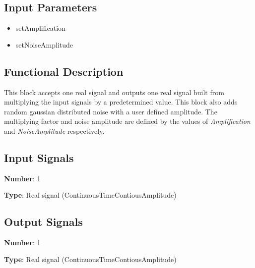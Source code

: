 \documentclass[../../sdf/tex/BPSK_system.tex]{subfiles}
\begin{document}
\onlyinsubfile{\maketitle}

\subsection*{Input Parameters}

\begin{multicols}{2}
	\begin{itemize}
		\item setAmplification
		\item setNoiseAmplitude
	\end{itemize}
\end{multicols}

\subsection*{Functional Description}

This block accepts one real signal and outputs one real signal built from multiplying the input signals by a predetermined value. This block also adds random gaussian distributed noise with a user defined amplitude. The multiplying factor and noise amplitude are defined by the values of \textit{Amplification} and \textit{NoiseAmplitude} respectively.

\subsection*{Input Signals}

\textbf{Number}: 1

\textbf{Type}: Real signal (ContinuousTimeContiousAmplitude)

\subsection*{Output Signals}

\textbf{Number}: 1

\textbf{Type}: Real signal (ContinuousTimeContiousAmplitude)
\end{document}
